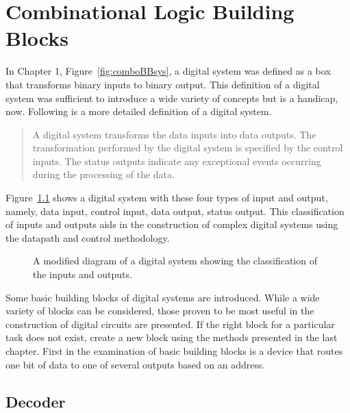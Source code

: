 \chapter{Combinational Logic Building Blocks}
\label{chapter:Combinational Building Blocks}
\graphicspath{ {./chapter04/Fig} }

In Chapter 1, Figure~\ref{fig:comboBBsys}, a digital system was defined
as a box that transforms binary inputs to binary output.  This definition
of a digital system was sufficient to introduce  a wide variety of
concepts but is a handicap, now. Following is a more detailed
definition of a digital system.
\begin{quote}  A digital system transforms the data inputs into
    data outputs.  The transformation performed by the digital system is
    specified by the control inputs.  The status outputs indicate any
    exceptional events occurring during the processing of the data.
\end{quote}

Figure~\ref{fig:comboBBAsys} shows a digital system with these four types
of input and output, namely, data input, control input, data output, status output.
This classification of inputs and outputs aids in the
construction of complex digital systems using the datapath and
control methodology.

\begin{figure}[ht]
    \caption{A modified diagram of a digital system showing the classification
    of the inputs and outputs.}
    \label{fig:comboBBAsys}
\end{figure}

Some basic building blocks of digital systems are introduced.
While a wide variety of blocks can be considered, those
proven to be most useful in the construction
of digital circuits are presented.  If the right block for a particular
task does not exist, create a new block using the methods presented
in the last chapter.  First in the examination of basic building
blocks is a device that routes one bit of data to one of several
outputs based on an address.

\section{Decoder}

